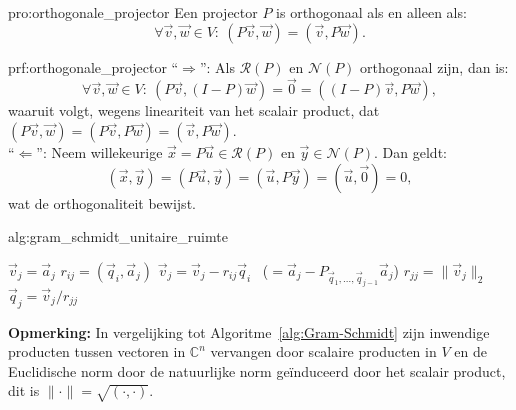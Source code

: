 \begin{pro}{pro:orthogonale_projector}
    Een projector $P$ is orthogonaal als en alleen als:
    \begin{equation*}
        \forall \vec{v},\vec{w} \in V: \ (P\vec{v},\vec{w}) = (\vec{v},P\vec{w}).
    \end{equation*}
    \vspace{-0.5cm}
\end{pro}

\begin{prf}{prf:orthogonale_projector}
    ``$\Rightarrow$'': Als $\mathcal{R}(P)$ en $\mathcal{N}(P)$ orthogonaal zijn, dan is:
    \begin{equation*}
        \forall \vec{v},\vec{w} \in V: \ (P\vec{v},(I-P)\vec{w}) = \vec{0} = ((I-P)\vec{v},P\vec{w}),
    \end{equation*}
    waaruit volgt, wegens lineariteit van het scalair product, dat $(P\vec{v},\vec{w}) = (P\vec{v}, P\vec{w}) = (\vec{v},P\vec{w})$. \\
    
    ``$\Leftarrow$'': Neem willekeurige $\vec{x} = P\vec{u} \in \mathcal{R}(P)$ en $\vec{y} \in \mathcal{N}(P)$. Dan geldt:
    \begin{equation*}
        (\vec{x},\vec{y}) = (P\vec{u},\vec{y}) = (\vec{u},P\vec{y}) = (\vec{u},\vec{0}) = 0,
    \end{equation*}
    wat de orthogonaliteit bewijst.
\end{prf}

\newpage

\begin{alg}{alg:gram_schmidt_unitaire_ruimte}
    \begin{tcolorbox}[colback=white, colframe=gray, arc=0mm] 
        \begin{algorithmic}[1]
            \State $\vec{v}_j = \vec{a}_j$
                \State $r_{ij} = (\vec{q}_i,\vec{a}_j)$
                \State $\vec{v}_j = \vec{v}_j - r_{ij} \vec{q}_i$  \ ($= \vec{a}_j - P_{\vec{q}_1, \ldots, \vec{q}_{j-1}}\vec{a}_j$)
            \EndFor
            \State $r_{jj} = \|\vec{v}_j\|_2$
            \State $\vec{q}_j = \vec{v}_j / r_{jj}$
        \EndFor
        \end{algorithmic}
    \end{tcolorbox}
    \vspace{0.3cm}
    \textbf{Opmerking:} In vergelijking tot Algoritme~\ref{alg:Gram-Schmidt} zijn inwendige producten tussen vectoren in $\mathbb{C}^n$ vervangen door scalaire producten in $V$ en de Euclidische norm door de natuurlijke norm geïnduceerd door het scalair product, dit is $\|\cdot\| = \sqrt{(\cdot,\cdot)}$.
\end{alg}

